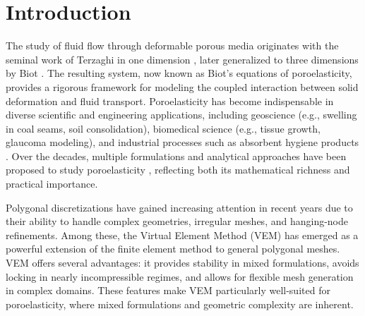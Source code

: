 \documentclass[smallextended]{svjour3}
\numberwithin{equation}{section}
\numberwithin{figure}{section}
\numberwithin{table}{section}
\begin{document}
	
	\section{Introduction}

    The study of fluid flow through deformable porous media originates with the seminal work of Terzaghi in one dimension \cite{terzhagi25}, later generalized to three dimensions by Biot \cite{biot41}. The resulting system, now known as Biot’s equations of poroelasticity, provides a rigorous framework for modeling the coupled interaction between solid deformation and fluid transport. Poroelasticity has become indispensable in diverse scientific and engineering applications, including geoscience (e.g., swelling in coal seams, soil consolidation), biomedical science (e.g., tissue growth, glaucoma modeling), and industrial processes such as absorbent hygiene products \cite{collis17,nespoli25}. Over the decades, multiple formulations and analytical approaches have been proposed to study poroelasticity \cite{or_sinum16,yi17,phillips,verma24,verma26}, reflecting both its mathematical richness and practical importance. 

    Polygonal discretizations have gained increasing attention in recent years due to their ability to handle complex geometries, irregular meshes, and hanging-node refinements. Among these, the Virtual Element Method (VEM) \cite{ahmad13,beirao-b13,beirao-div17} has emerged as a powerful extension of the finite element method to general polygonal meshes. VEM offers several advantages: it provides stability in mixed formulations, avoids locking in nearly incompressible regimes, and allows for flexible mesh generation in complex domains. These features make VEM particularly well-suited for poroelasticity, where mixed formulations and geometric complexity are inherent.
    
\end{document}
